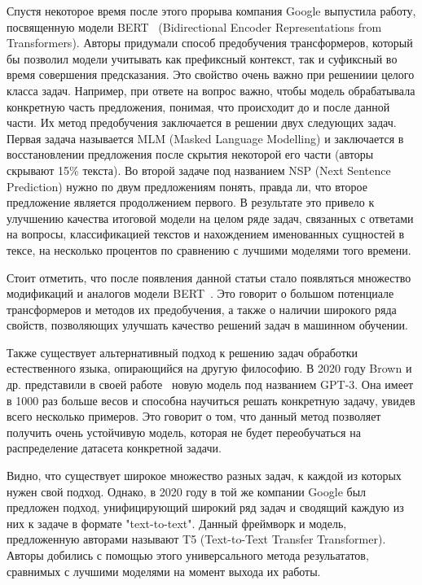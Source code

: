 \documentclass{spbau-diploma}
\begin{document}
Спустя некоторое время после этого прорыва компания Google выпустила работу, посвященную модели BERT~\cite{devlin2018bert} (Bidirectional Encoder Representations from Transformers). Авторы придумали способ предобучения трансформеров, который бы позволил модели учитывать как префиксный контекст, так и суфиксный во время совершения предсказания. Это свойство очень важно при решениии целого класса задач. Например, при ответе на вопрос важно, чтобы модель обрабатывала конкретную часть предложения, понимая, что происходит до и после данной части. Их метод предобучения заключается в решении двух следующих задач. Первая задача называется MLM (Masked Language Modelling) и заключается в восстановлении предложения после скрытия некоторой его части (авторы скрывают 15\% текста). Во второй задаче под названием NSP (Next Sentence Prediction) нужно по двум предложениям понять, правда ли, что второе предложение является продолжением первого. В результате это привело к улучшению качества итоговой модели на целом ряде задач, связанных с ответами на вопросы, классификацией текстов и нахождением именованных сущностей в тексе, на несколько процентов по сравнению с лучшими моделями того времени. 

Стоит отметить, что после появления данной статьи стало появляться множество модификаций и аналогов модели BERT~\cite{lan2019albert,lewis2019bart,he2020deberta,sanh2019distilbert,le2019flaubert,nguyen2020phobert,liu2019roberta,iandola2020squeezebert}. Это говорит о большом потенциале трансформеров и методов их предобучения, а также о наличии широкого ряда свойств, позволяющих улучшать качество решений задач в машинном обучении.

Также существует альтернативный подход к решению задач обработки естественного языка, опирающийся на другую философию. В 2020 году Brown и др. представили в своей работе~\cite{brown2020language} новую модель под названием GPT-3. Она имеет в 1000 раз больше весов и способна научиться решать конкретную задачу, увидев всего несколько примеров. Это говорит о том, что данный метод позволяет получить очень устойчивую модель, которая не будет переобучаться на распределение датасета конкретной задачи.

Видно, что существует широкое множество разных задач, к каждой из которых нужен свой подход. Однако, в 2020 году в той же компании Google был предложен подход, унифицирующий широкий ряд задач и сводящий каждую из них к задаче в формате "text-to-text". Данный фреймворк и модель, предложенную авторами называют T5 (Text-to-Text Transfer Transformer). Авторы добились с помощью этого универсального метода резульататов, сравнимых с лучшими моделями на момент выхода их работы.
\end{document}
